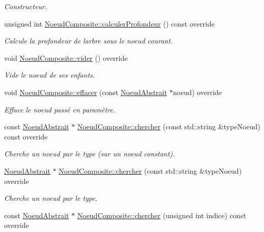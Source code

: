 \begin{DoxyCompactItemize}
\begin{DoxyCompactList}\small\item\em Constructeur. \end{DoxyCompactList}\item 
unsigned int \hyperlink{group__inf2990_gaf9a41e3632a6a321388c7705cfbece21}{Noeud\+Composite\+::calculer\+Profondeur} () const  override
\begin{DoxyCompactList}\small\item\em Calcule la profondeur de l\textquotesingle{}arbre sous le noeud courant. \end{DoxyCompactList}\item 
void \hyperlink{group__inf2990_gaede690fd0ecafe4244479ca4f054a65f}{Noeud\+Composite\+::vider} () override
\begin{DoxyCompactList}\small\item\em Vide le noeud de ses enfants. \end{DoxyCompactList}\item 
void \hyperlink{group__inf2990_gad6e967709392313acafee99a9a05a5a5}{Noeud\+Composite\+::effacer} (const \hyperlink{class_noeud_abstrait}{Noeud\+Abstrait} $\ast$noeud) override
\begin{DoxyCompactList}\small\item\em Efface le noeud passé en paramètre. \end{DoxyCompactList}\item 
const \hyperlink{class_noeud_abstrait}{Noeud\+Abstrait} $\ast$ \hyperlink{group__inf2990_ga10f285f39739539bbf9f8cb4b6383414}{Noeud\+Composite\+::chercher} (const std\+::string \&type\+Noeud) const  override
\begin{DoxyCompactList}\small\item\em Cherche un noeud par le type (sur un noeud constant). \end{DoxyCompactList}\item 
\hyperlink{class_noeud_abstrait}{Noeud\+Abstrait} $\ast$ \hyperlink{group__inf2990_gad7f54e2eb26b9ce59fbaedb2d0090f0e}{Noeud\+Composite\+::chercher} (const std\+::string \&type\+Noeud) override
\begin{DoxyCompactList}\small\item\em Cherche un noeud par le type. \end{DoxyCompactList}\item 
const \hyperlink{class_noeud_abstrait}{Noeud\+Abstrait} $\ast$ \hyperlink{group__inf2990_gaa522a1f30c1d045745ed04b680e2649b}{Noeud\+Composite\+::chercher} (unsigned int indice) const  override

\end{DoxyCompactItemize}
